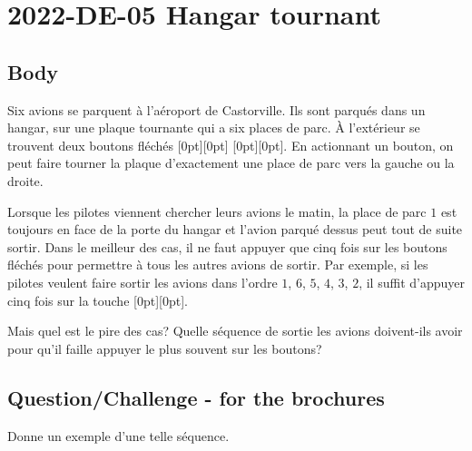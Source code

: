 \documentclass[a4paper,11pt]{report}
\newcommand{\taskGraphicsFolder}{..}
\begin{document}
\section*{\centering{} 2022-DE-05 Hangar tournant}


\subsection*{Body}

Six avions se parquent à l’aéroport de Castorville. Ils sont parqués dans un hangar, sur une plaque tournante qui a six places de parc. À l’extérieur se trouvent deux boutons fléchés \raisebox{-0.5ex}[0pt][0pt]{} \raisebox{-0.5ex}[0pt][0pt]{}. En actionnant un bouton, on peut faire tourner la plaque d’exactement une place de parc vers la gauche ou la droite.

{\centering%
\par}

Lorsque les pilotes viennent chercher leurs avions le matin, la place de parc $1$ est toujours en face de la porte du hangar et l’avion parqué dessus peut tout de suite sortir. Dans le meilleur des cas, il ne faut appuyer que cinq fois sur les boutons fléchés pour permettre à tous les autres avions de sortir. Par exemple, si les pilotes veulent faire sortir les avions dans l’ordre $1$, $6$, $5$, $4$, $3$, $2$, il suffit d’appuyer cinq fois sur la touche \raisebox{-0.5ex}[0pt][0pt]{}.

Mais quel est le pire des cas? Quelle séquence de sortie les avions doivent-ils avoir pour qu’il faille appuyer le plus souvent sur les boutons?

{\em


\subsection*{Question/Challenge - for the brochures}

Donne un exemple d’une telle séquence.

{\centering%
\par}

}
\end{document}
